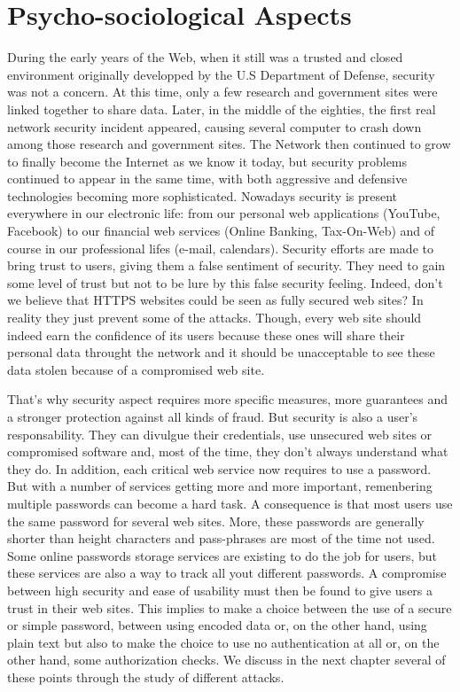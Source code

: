 
\section{Psycho-sociological Aspects}

During the early years of the Web, when it still was a trusted and closed
environment originally developped by the U.S Department of Defense, security was
not a concern. At this time, only a few research and government sites were
linked together to share data. Later, in the middle of the eighties, the first
real network security incident appeared, causing several computer to crash down
among those research and government sites. The Network then continued to grow to
finally become the Internet as we know it today, but security problems continued
to appear in the same time, with both aggressive and defensive technologies
becoming more sophisticated. Nowadays security is present everywhere in our
electronic life: from our personal web applications (YouTube, Facebook) to our
financial web services (Online Banking, Tax-On-Web) and of course in our
professional lifes (e-mail, calendars). Security efforts are made to bring trust
to users, giving them a false sentiment of security. They need to gain some
level of trust but not to be lure by this false security feeling. Indeed, don't
we believe that HTTPS websites could be seen as fully secured web sites? In
reality they just prevent some of the attacks. Though, every web site should
indeed earn the confidence of its users because these ones will share their
personal data throught the network and it should be unacceptable to see these
data stolen because of a compromised web site.

That's why security aspect requires more specific measures, more guarantees and
a stronger protection against all kinds of fraud. But security is also a user's
responsability. They can divulgue their credentials, use unsecured web sites or
compromised software and, most of the time, they don't always understand what
they do. In addition, each critical web service now requires to use a password.
But with a number of services getting more and more important, remenbering
multiple passwords can become a hard task. A consequence is that most users use
the same password for several web sites. More, these passwords are generally
shorter than height characters and pass-phrases are most of the time not used.
Some online passwords storage services are existing to do the job for users, but
these services are also a way to track all yout different passwords. A
compromise between high security and ease of usability must then be found to
give users a trust in their web sites. This implies to make a choice between the
use of a secure or simple password, between using encoded data or, on the other
hand, using plain text but also to make the choice to use no authentication at
all or, on the other hand, some authorization checks. We discuss in the next
chapter several of these points through the study of different attacks.

